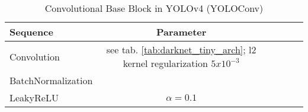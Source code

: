\begin{table}
\begin{center}

\begin{tabular}{l|c|c|c|c|c}
    \textbf{Sequence} & \textbf{Parameter}\\
    \hline
    Convolution & see tab. \ref{tab:darknet_tiny_arch}; l2 kernel regularization $5x10^{-3}$\\
    BatchNormalization &\\
    LeakyReLU & $\alpha = 0.1$\\

\end{tabular}
\caption{Convolutional Base Block in YOLOv4 (YOLOConv)}
\label{tab:yoloconv}

\end{center}
\end{table}


